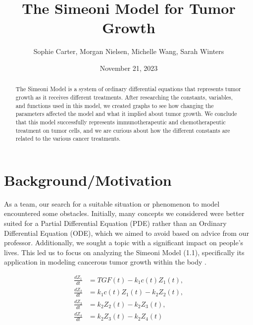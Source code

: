 \documentclass[11pt]{amsart}
\begin{document}
\title{The Simeoni Model for Tumor Growth}
\author{Sophie Carter, Morgan Nielsen, Michelle Wang, Sarah Winters}
\date{November 21, 2023}



\maketitle

\begin{abstract}
The Simeoni Model is a system of ordinary differential equations that represents tumor growth as it receives different treatments. After researching the constants, variables, and functions used in this model, we created graphs to see how changing the parameters affected the model and what it implied about tumor growth. We conclude that this model successfully represents immunotherapeutic and chemotherapeutic treatment on tumor cells, and we are curious about how the different constants are related to the various cancer treatments. 
\end{abstract}

\section{Background/Motivation}
As a team, our search for a suitable situation or phenomenon to model encountered some obstacles. Initially, many concepts we considered were better suited for a Partial Differential Equation (PDE) rather than an Ordinary Differential Equation (ODE), which we aimed to avoid based on advice from our professor. Additionally, we sought a topic with a significant impact on people's lives. This led us to focus on analyzing the Simeoni Model (1.1), specifically its application in modeling cancerous tumor growth within the body \cite{Koziol_Falls_Schnitzer_2020}.

\begin{equation}\label{eq:1.1}
\begin{aligned}
    \frac{dZ_1}{dt} &= TGF(t) - k_1c(t)Z_1(t), \\
    \frac{dZ_2}{dt} &= k_1c(t)Z_1(t) - k_2Z_2(t), \\ 
    \frac{dZ_3}{dt} &= k_2Z_2(t) - k_2Z_3(t), \\
    \frac{dZ_4}{dt} &= k_2Z_3(t) - k_2Z_4(t)
\end{aligned}
\tag*{(1.1)}
\end{equation}
\hspace{2em}
 
\end{document}
